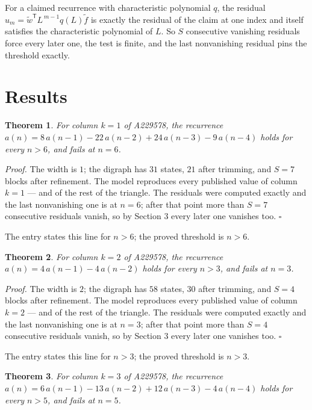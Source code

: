 \documentclass[11pt]{article}
\newtheorem{theorem}{Theorem}
\theoremstyle{definition}
\begin{document}
For a claimed recurrence with characteristic polynomial $q$, the residual $u_m = \tilde w^{\mathsf T}L^{\,m-1}q(L)\tilde f$ is exactly the residual of the claim at one index and itself satisfies the characteristic polynomial of $L$. So $S$ consecutive vanishing residuals force every later one, the test is finite, and the last nonvanishing residual pins the threshold exactly.

\section{Results}

\begin{theorem} For column $k = 1$ of A229578, the recurrence $a(n) = 8\,a(n-1) - 22\,a(n-2) + 24\,a(n-3) - 9\,a(n-4)$ holds for every $n > 6$, and fails at $n = 6$.\end{theorem}

{\itshape Proof.} The width is $1$; the digraph has $31$ states, $21$ after trimming, and $S = 7$ blocks after refinement. The model reproduces every published value of column $k = 1$ --- and of the rest of the triangle. The residuals were computed exactly and the last nonvanishing one is at $n = 6$; after that point more than $S = 7$ consecutive residuals vanish, so by Section 3 every later one vanishes too. $\square$

The entry states this line for $n > 6$; the proved threshold is $n > 6$.

\begin{theorem} For column $k = 2$ of A229578, the recurrence $a(n) = 4\,a(n-1) - 4\,a(n-2)$ holds for every $n > 3$, and fails at $n = 3$.\end{theorem}

{\itshape Proof.} The width is $2$; the digraph has $58$ states, $30$ after trimming, and $S = 4$ blocks after refinement. The model reproduces every published value of column $k = 2$ --- and of the rest of the triangle. The residuals were computed exactly and the last nonvanishing one is at $n = 3$; after that point more than $S = 4$ consecutive residuals vanish, so by Section 3 every later one vanishes too. $\square$

The entry states this line for $n > 3$; the proved threshold is $n > 3$.

\begin{theorem} For column $k = 3$ of A229578, the recurrence $a(n) = 6\,a(n-1) - 13\,a(n-2) + 12\,a(n-3) - 4\,a(n-4)$ holds for every $n > 5$, and fails at $n = 5$.\end{theorem}
\end{document}

